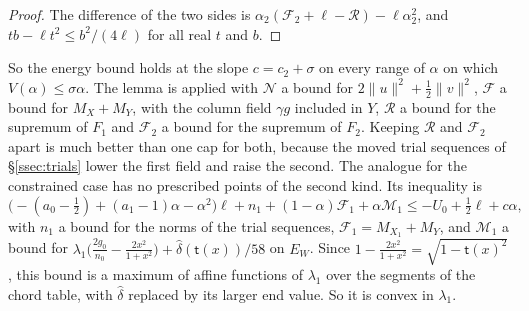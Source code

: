 \documentclass[11pt]{amsart}
\theoremstyle{definition}
\theoremstyle{remark}
\numberwithin{equation}{section}
\begin{document}
\begin{proof}
The difference of the two sides is $\alpha_2(\mathcal F_2+\ell-\mathcal R)-\ell\alpha_2^2$, and
$tb-\ell t^2\le b^2/(4\ell)$ for all real $t$ and $b$.
\end{proof}

So the energy bound holds at the slope $c=c_2+\sigma$ on every range of $\alpha$ on which $V(\alpha)\le\sigma\alpha$.
The lemma is applied with $\mathcal N$ a bound for $2\|u\|^2+\frac12\|v\|^2$, $\mathcal F$ a bound for $M_X+M_Y$, with the
column field $\gamma g$ included in $Y$, $\mathcal R$ a bound for the supremum of $F_1$ and $\mathcal F_2$ a bound for the
supremum of $F_2$. Keeping $\mathcal R$ and $\mathcal F_2$ apart is much better than one cap for both, because the moved
trial sequences of \S\ref{ssec:trials} lower the first field and raise the second. The analogue for the constrained case has no prescribed
points of the second kind. Its inequality is
\[
 \bigl(-(a_0-\tfrac12)+(a_1-1)\alpha-\alpha^2\bigr)\ell+n_1+(1-\alpha)\mathcal F_1+\alpha\mathcal M_1
 \le-U_0+\tfrac12\ell+c\alpha,
\]
with $n_1$ a bound for the norms of the trial sequences, $\mathcal F_1=M_{X_1}+M_Y$, and $\mathcal M_1$ a bound for
$\lambda_1\bigl(\frac{2g_0}{n_0}-\frac{2x^2}{1+x^2}\bigr)+\hat\delta(\mathsf t(x))/58$ on $E_W$. Since
$1-\frac{2x^2}{1+x^2}=\sqrt{1-\mathsf t(x)^2}$, this bound is a maximum of affine functions of $\lambda_1$ over the
segments of the chord table, with $\hat\delta$ replaced by its larger end value. So it is convex in $\lambda_1$.
\end{document}
